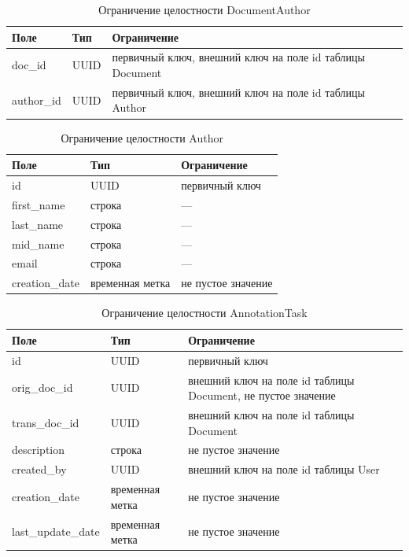 \begin{table}[H]
\centering
\caption{Ограничение целостности DocumentAuthor}
\begin{tabular}{|m{3cm}|m{3cm}|m{6cm}|}
\hline
\textbf{Поле} & \textbf{Тип} & \textbf{Ограничение} \\ \hline
doc\_id & UUID & первичный ключ, внешний ключ на поле id таблицы Document \\ \hline
author\_id & UUID & первичный ключ, внешний ключ на поле id таблицы Author \\ \hline
\end{tabular}
\label{tab:docauthor}
\end{table}

\begin{table}[H]
\centering
\caption{Ограничение целостности Author}
\begin{tabular}{|m{3cm}|m{3cm}|m{6cm}|}
\hline
\textbf{Поле} & \textbf{Тип} & \textbf{Ограничение} \\ \hline
id & UUID & первичный ключ \\ \hline
first\_name & строка & --- \\ \hline
last\_name & строка & --- \\ \hline
mid\_name & строка & --- \\ \hline
email & строка & --- \\ \hline
creation\_date & временная метка & не пустое значение \\ \hline
\end{tabular}
\label{tab:author}
\end{table}

\begin{table}[H]
\centering
\caption{Ограничение целостности AnnotationTask}
\begin{tabular}{|m{4cm}|m{3cm}|m{6cm}|}
\hline
\textbf{Поле} & \textbf{Тип} & \textbf{Ограничение} \\ \hline
id & UUID & первичный ключ \\ \hline
orig\_doc\_id & UUID & внешний ключ на поле id таблицы Document, не пустое значение \\ \hline
trans\_doc\_id & UUID & внешний ключ на поле id таблицы Document \\ \hline
description & строка & не пустое значение \\ \hline
created\_by & UUID & внешний ключ на поле id таблицы User \\ \hline
creation\_date & временная метка & не пустое значение \\ \hline
last\_update\_date & временная метка & не пустое значение \\ \hline
\end{tabular}
\label{tab:annottask}
\end{table}

